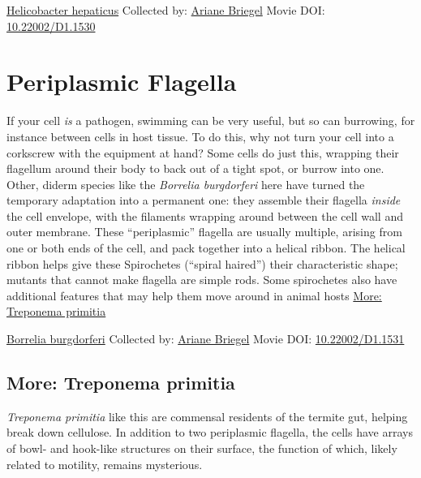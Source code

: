 \documentclass[]{tufte-book}
\begin{document}
\hypertarget{htmlwidget-c84466fb7931c6ef2c57}{}

\label{fig:6-6}\protect\hyperlink{tree}{Helicobacter hepaticus} Collected by: \protect\hyperlink{ariane_briegel}{Ariane Briegel} Movie DOI: \href{https://doi.org/10.22002/D1.1530}{10.22002/D1.1530}

\hypertarget{periplasmic-flagella}{%
\section{Periplasmic Flagella}\label{periplasmic-flagella}}

If your cell \emph{is} a pathogen, swimming can be very useful, but so can burrowing, for instance between cells in host tissue. To do this, why not turn your cell into a corkscrew with the equipment at hand? Some cells do just this, wrapping their flagellum around their body to back out of a tight spot, or burrow into one. Other, diderm species like the \emph{Borrelia burgdorferi} here have turned the temporary adaptation into a permanent one: they assemble their flagella \emph{inside} the cell envelope, with the filaments wrapping around between the cell wall and outer membrane. These ``periplasmic'' flagella are usually multiple, arising from one or both ends of the cell, and pack together into a helical ribbon. The helical ribbon helps give these Spirochetes (``spiral haired'') their characteristic shape; mutants that cannot make flagella are simple rods. Some spirochetes also have additional features that may help them move around in animal hosts \protect\hyperlink{Treponema_primitia}{More: Treponema primitia}



\hypertarget{htmlwidget-e139bffb928b49e0d10c}{}

\label{fig:6-7}\protect\hyperlink{tree}{Borrelia burgdorferi} Collected by: \protect\hyperlink{ariane_briegel}{Ariane Briegel} Movie DOI: \href{https://doi.org/10.22002/D1.1531}{10.22002/D1.1531}

\hypertarget{Treponema_primitia}{%
\subsection*{More: Treponema primitia}\label{Treponema_primitia}}

\emph{Treponema primitia} like this are commensal residents of the termite gut, helping break down cellulose. In addition to two periplasmic flagella, the cells have arrays of bowl- and hook-like structures on their surface, the function of which, likely related to motility, remains mysterious.
\end{document}
